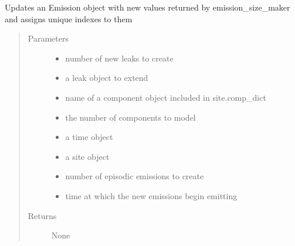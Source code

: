 \documentclass[letterpaper,10pt,english]{sphinxmanual}
\begin{document}
\begin{fulllineitems}
\begin{fulllineitems}
\label{\detokenize{index:feast.EmissionSimModules.infrastructure_classes.GasField.emission_maker}}
Updates an Emission object with new values returned by emission\_size\_maker and assigns unique indexes to them
\begin{quote}\begin{description}
\item[{Parameters}] \leavevmode\begin{itemize}
\item {} 
 \textendash{} number of new leaks to create

\item {} 
 \textendash{} a leak object to extend

\item {} 
 \textendash{} name of a component object included in site.comp\_dict

\item {} 
 \textendash{} the number of components to model

\item {} 
 \textendash{} a time object

\item {} 
 \textendash{} a site object

\item {} 
 \textendash{} number of episodic emissions to create

\item {} 
 \textendash{} time at which the new emissions begin emitting

\end{itemize}

\item[{Returns}] \leavevmode
None


\end{description}
\end{quote}
\end{fulllineitems}
\end{fulllineitems}
\end{document}
